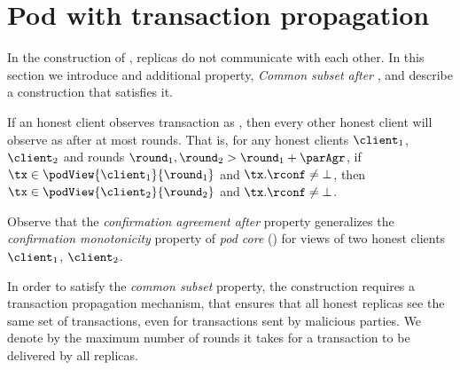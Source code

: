 \section{Pod with transaction propagation} \label{sec:pod-with-propagation}
In the construction of , replicas do not communicate with each other.
In this section we introduce and additional property, \emph{Common subset after \parAgr}, and describe a construction that satisfies it.


\begin{definition}
    If an honest client observes transaction \tx as \confirmed,
    then every other honest client will observe \tx as \confirmed after at most \parAgr rounds.
    That is, for any honest clients $\client_1$, $\client_2$ and rounds $\round_1, \round_2 > \round_1 + \parAgr$,
    if $\tx \in \podView{\client_1}{\round_1}$ and $\tx.\rconf \neq \bot$, then $\tx \in \podView{\client_2}{\round_2}$ and $\tx.\rconf \neq \bot$.
\end{definition}
Observe that the \emph{confirmation agreement after \parAgr} property generalizes the \emph{confirmation monotonicity} property of \emph{pod core} () for views of two honest clients $\client_1$, $\client_2$.

    

\begin{construction}\label{cons:pod-with-prop}
    In order to satisfy the \emph{common subset} property,
    the construction requires a transaction propagation mechanism, that ensures that all honest replicas see the same set of transactions,
    even for transactions sent by malicious parties.
    We denote by \tProp the maximum number of rounds it takes for a transaction to be delivered by all replicas.
\end{construction}

